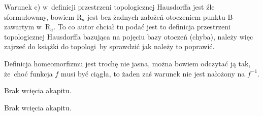 \documentclass[a4paper,11pt]{article}
\begin{document}










\newpage





 Warunek c) w~definicji przestrzeni topologicznej Hausdorffa jest
źle sformułowany, bowiem $\mathrm{R}_{ a }$ jest bez żadnych założeń
otoczeniem punktu B zawartym w~$\mathrm{R}_{ a }$. To co autor chciał tu
podać jest to definicja przestrzeni topologicznej Hausdorffa bazująca na
pojęciu bazy otoczeń (chyba), należy więc zajrzeć do książki do
topologi~by sprawdzić jak należy to poprawić.

\vspace{\spaceFour}



Definicja homeomorfizmu jest trochę nie jasna, można bowiem odczytać ją
tak, że~choć funkcja $f$ musi być ciągła, to żaden zaś warunek nie jest
nałożony na $f^{ -1 }$.

\vspace{\spaceFour}





 Brak wcięcia akapitu.

\vspace{\spaceFour}





 Brak wcięcia akapitu.

\vspace{\spaceFour}






\newpage

\end{document}
